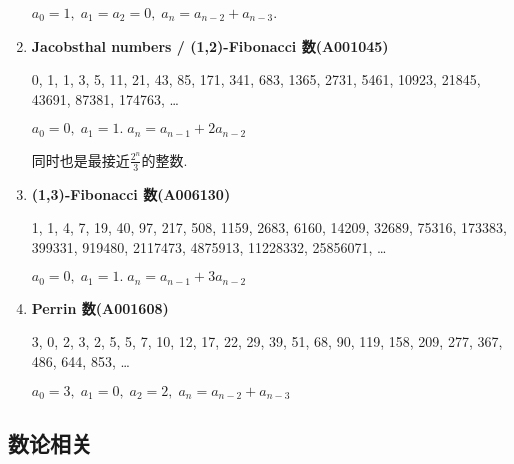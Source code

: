 \begin{enumerate}
          \(a_0 = 1,\; a_1 = a_2 = 0,\; a_n = a_{n - 2} + a_{n - 3}\).
          
    \item \textbf{Jacobsthal numbers / (1,2)-Fibonacci 数(A001045)}
          
          0, 1, 1, 3, 5, 11, 21, 43, 85, 171, 341, 683, 1365, 2731, 5461, 10923, 21845, 43691, 87381, 174763, \dots
          
          \( a_0 = 0,\; a_1 = 1.\; a_n = a_{n - 1} + 2a_{n - 2} \)
          
          同时也是最接近\(\frac {2 ^ n} 3\)的整数.
          
    \item \textbf{(1,3)-Fibonacci 数(A006130)}
          
          1, 1, 4, 7, 19, 40, 97, 217, 508, 1159, 2683, 6160, 14209, 32689, 75316, 173383, 399331, 919480, 2117473, 4875913, 11228332, 25856071, \dots
          
          \( a_0 = 0,\; a_1 = 1.\; a_n = a_{n - 1} + 3a_{n - 2} \)
          
    \item \textbf{Perrin 数(A001608)}
          
          3, 0, 2, 3, 2, 5, 5, 7, 10, 12, 17, 22, 29, 39, 51, 68, 90, 119, 158, 209, 277, 367, 486, 644, 853, \dots
          
          \( a_0 = 3,\; a_1 = 0,\; a_2 = 2,\; a_n = a_{n - 2} + a_{n - 3} \)
\end{enumerate}

\subsection{数论相关}

